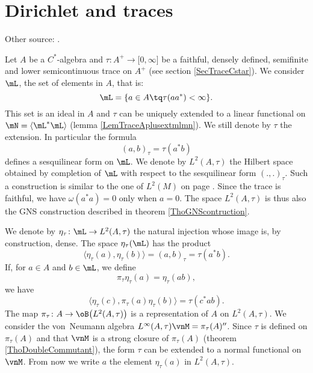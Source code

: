 \section{Dirichlet and traces}

Other source: \cite{CiprianiStandardForms,CiprianiSauvageotSquareRoots}.

Let $A$ be a $C^*$-algebra and $\tau\colon A^+\to \mathopen[ 0 , \infty \mathclose]$ be a faithful, densely defined, semifinite and lower semicontinuous trace on $A^+$ (see section \ref{SecTraceCstar}). We consider \(\mL\), the set of  elements in \(A\), that is:
\begin{equation}
	\mL=\{ a\in A\tq \tau(aa^*)<\infty \}.
\end{equation}
This set is an ideal in $A$ and $\tau$ can be uniquely extended to a linear functional on $\mN=\langle \mL^*\mL\rangle$ (lemma \ref{LemTraceAplusextmlmn}). We still denote by $\tau$ the extension. In particular the formula
\begin{equation}
	(a,b)_{\tau}=\tau(a^*b)
\end{equation}
defines a sesquilinear form on $\mL$. We denote by $L^2(A,\tau)$ the Hilbert space obtained by completion of $\mL$ with respect to the sesquilinear form $(.,.)_{\tau}$. Such a construction is similar to the one of $L^2(M)$ on page \pageref{PgLdM}. Since the trace is faithful, we have \(\omega(a^*a)=0\) only when \(a=0\). The space \(L^2(A,\tau)\) is thus also the GNS construction described in theorem \ref{ThoGNScontruction}.

We denote by $\eta_{\tau}\colon \mL\to L^2(A,\tau)$ the natural injection whose image is, by construction, dense. The space $\eta_{\tau}(\mL)$ has the product
\begin{equation}
	\langle \eta_{\tau}(a), \eta_{\tau}(b)\rangle =(a,b)_{\tau}=\tau(a^*b).
\end{equation}
If, for $a\in A$ and $b\in\mL$, we define
\begin{equation}
	\pi_{\tau}\eta_{\tau}(a)=\eta_{\tau}(ab),
\end{equation}
we have
\begin{equation}
	\langle \eta_{\tau}(c), \pi_{\tau}(a)\eta_{\tau}(b)\rangle =\tau(c^*ab).
\end{equation}
The map $\pi_{\tau}\colon A\to \oB\big(L^2(A,\tau)\big)$ is a representation of $A$ on $L^2(A,\tau)$. We consider the von~Neumann algebra $L^{\infty}(A,\tau)\vnM=\pi_{\tau}(A)''$. Since $\tau$ is defined on $\pi_{\tau}(A)$ and that $\vnM$ is a strong closure of $\pi_{\tau}(A)$ (theorem \ref{ThoDoubleCommutant}), the form $\tau$ can be extended to a normal functional on $\vnM$. From now we write $a$ the element $\eta_{\tau}(a)$ in $L^2(A,\tau)$.


